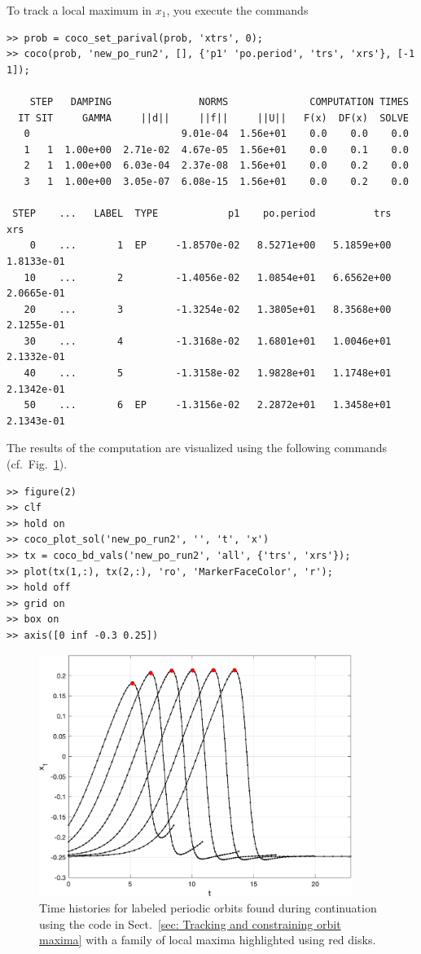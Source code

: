 To track a local maximum in $x_1$, you execute the commands
\begin{lstlisting}[language=coco-highlight,frame=lines]
>> prob = coco_set_parival(prob, 'xtrs', 0);
>> coco(prob, 'new_po_run2', [], {'p1' 'po.period', 'trs', 'xrs'}, [-1 1]);

    STEP   DAMPING               NORMS              COMPUTATION TIMES
  IT SIT     GAMMA     ||d||     ||f||     ||U||   F(x)  DF(x)  SOLVE
   0                          9.01e-04  1.56e+01    0.0    0.0    0.0
   1   1  1.00e+00  2.71e-02  4.67e-05  1.56e+01    0.0    0.1    0.0
   2   1  1.00e+00  6.03e-04  2.37e-08  1.56e+01    0.0    0.2    0.0
   3   1  1.00e+00  3.05e-07  6.08e-15  1.56e+01    0.0    0.2    0.0

 STEP    ...   LABEL  TYPE            p1    po.period          trs          xrs
    0    ...       1  EP     -1.8570e-02   8.5271e+00   5.1859e+00   1.8133e-01
   10    ...       2         -1.4056e-02   1.0854e+01   6.6562e+00   2.0665e-01
   20    ...       3         -1.3254e-02   1.3805e+01   8.3568e+00   2.1255e-01
   30    ...       4         -1.3168e-02   1.6801e+01   1.0046e+01   2.1332e-01
   40    ...       5         -1.3158e-02   1.9828e+01   1.1748e+01   2.1342e-01
   50    ...       6  EP     -1.3156e-02   2.2872e+01   1.3458e+01   2.1343e-01
\end{lstlisting}
The results of the computation are visualized using the following commands (cf.\ Fig.~\ref{fig: Section7_4_3}).
\begin{lstlisting}[language=coco-highlight,frame=lines]
>> figure(2)
>> clf
>> hold on
>> coco_plot_sol('new_po_run2', '', 't', 'x')
>> tx = coco_bd_vals('new_po_run2', 'all', {'trs', 'xrs'});
>> plot(tx(1,:), tx(2,:), 'ro', 'MarkerFaceColor', 'r');
>> hold off
>> grid on
>> box on
>> axis([0 inf -0.3 0.25])
\end{lstlisting}
\begin{figure}[h]
\centering
\includegraphics[width=4in]{Figures/Section7_4_3.jpg}
\caption{Time histories for labeled periodic orbits found during continuation using the code in Sect.~\ref{sec: Tracking and constraining orbit maxima} with a family of local maxima highlighted using red disks.}
\label{fig: Section7_4_3}
\end{figure}

